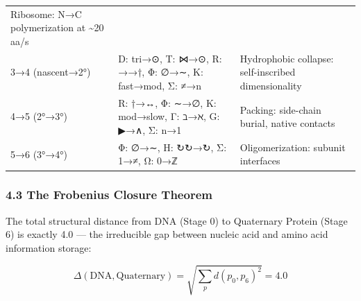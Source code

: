 \begin{longtable}[]{@{}lll@{}}
\begin{minipage}[t]{0.38\columnwidth}
Ribosome: N→C polymerization at \textasciitilde20 aa/s\strut
\end{minipage}\tabularnewline
\begin{minipage}[t]{0.24\columnwidth}\raggedright
3→4 (nascent→2°)\strut
\end{minipage} & \begin{minipage}[t]{0.30\columnwidth}\raggedright
D: tri→⊙, T: ⋈→⊙, R: →→†, Φ: ∅→∼, K: fast→mod, Σ: ≠→n\strut
\end{minipage} & \begin{minipage}[t]{0.38\columnwidth}\raggedright
Hydrophobic collapse: self-inscribed dimensionality\strut
\end{minipage}\tabularnewline
\begin{minipage}[t]{0.24\columnwidth}\raggedright
4→5 (2°→3°)\strut
\end{minipage} & \begin{minipage}[t]{0.30\columnwidth}\raggedright
R: †→↔, Φ: ∼→∅, K: mod→slow, Γ: ℶ→ℵ, G: ▶→∧, Σ: n→1\strut
\end{minipage} & \begin{minipage}[t]{0.38\columnwidth}\raggedright
Packing: side-chain burial, native contacts\strut
\end{minipage}\tabularnewline
\begin{minipage}[t]{0.24\columnwidth}\raggedright
5→6 (3°→4°)\strut
\end{minipage} & \begin{minipage}[t]{0.30\columnwidth}\raggedright
Φ: ∅→∼, H: ↻↻→↻, Σ: 1→≠, Ω: 0→ℤ\strut
\end{minipage} & \begin{minipage}[t]{0.38\columnwidth}\raggedright
Oligomerization: subunit interfaces\strut
\end{minipage}\tabularnewline
\bottomrule
\end{longtable}

\hypertarget{the-frobenius-closure-theorem}{%
\subsubsection{4.3 The Frobenius Closure
Theorem}\label{the-frobenius-closure-theorem}}

The total structural distance from DNA (Stage 0) to Quaternary Protein
(Stage 6) is exactly 4.0 --- the irreducible gap between nucleic acid
and amino acid information storage:

\[\Delta(\text{DNA}, \text{Quaternary}) = \sqrt{\sum_{p} d(p_0, p_6)^2} = 4.0\]

